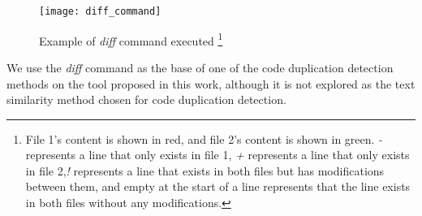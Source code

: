 \begin{figure}
\texttt{[image: diff\_command]}
\caption[Example of \textit{diff} command executed]{
Example of \textit{diff} command executed
\footnote{
File 1's content is shown in red, and file 2's content is shown in green. \textit{-} 
represents a line that only exists in file 1, \textit{+} represents a line that only 
exists in file 2,\textit{!} represents a line that exists in both files but has modifications 
between them, and empty at the start of a line represents that the line exists in 
both files without any modifications.
}
}
\label{fig:diff}
\end{figure}

We use the \textit{diff} command as the base of one of the code duplication detection 
methods on the tool proposed in this work, although it is not explored as the text 
similarity method chosen for code duplication detection.
